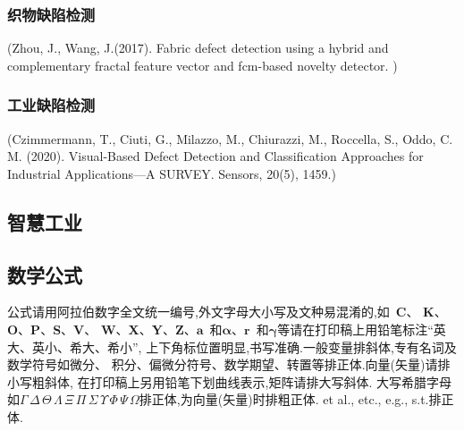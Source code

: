\documentclass{Style/aas}
\begin{document}
\begin{multicols}{2}
  \subsubsection{织物缺陷检测}
  (Zhou, J., Wang, J.(2017). Fabric defect detection using a hybrid and complementary fractal feature vector and fcm-based novelty detector. )

  \subsubsection{工业缺陷检测}
  (Czimmermann, T., Ciuti, G., Milazzo, M., Chiurazzi, M., Roccella, S., Oddo, C. M. (2020). Visual-Based Defect Detection and Classification Approaches for Industrial Applications—A SURVEY. Sensors, 20(5), 1459.)

  \subsection{智慧工业}







































  \subsection{数学公式}

  公式请用阿拉伯数字全文统一编号,外文字母大小写及文种易混淆的,如~{\bf C}、
  {\bf K}、{\bf O}、{\bf P}、{\bf S}、{\bf V}、{\bf
  W}、{\bf X}、{\bf Y}、{\bf Z}、${\pmb a}$~和${\pmb\alpha}$、${\pmb
        r}$~和${\pmb\gamma}$等请在打印稿上用铅笔标注``英大、英小、希大、希小'',
  上下角标位置明显,书写准确.一般变量排斜体,专有名词及数学符号如微分、
  积分、偏微分符号、数学期望、转置等排正体.向量(矢量)请排小写粗斜体,
  在打印稿上另用铅笔下划曲线表示,矩阵请排大写斜体.
  大写希腊字母如$\Gamma\,\Delta\,\Theta\,\Lambda\,\Xi\,\Pi\,\Sigma\,
    \Upsilon\,\Phi\,\Psi\,\Omega$排正体,为向量(矢量)时排粗正体. et al.,
  etc., e.g., s.t.排正体.


\end{multicols}
\end{document}
